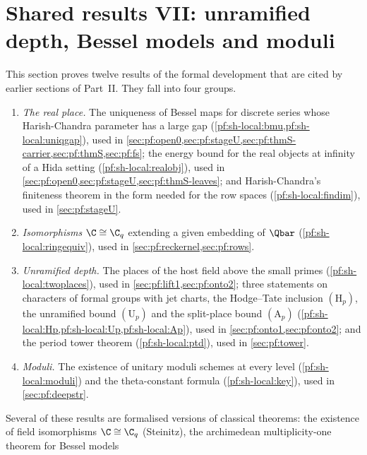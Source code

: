 \section{Shared results VII: unramified depth, Bessel models and moduli}\label{sec:pf:sh-local}

\providecommand{\shlocalpsi}{\psi_{\mathrm{std}}}
\providecommand{\shlocalHS}[1]{\|#1\|_{\mathrm{HS}}}
\providecommand{\shlocalE}{\mathcal{E}}
\providecommand{\shlocalOE}{\OO_{E}}
\providecommand{\shlocalZOE}{\Z_p\otimes\OO_E}

This section proves twelve results of the formal development \cite{LeanSource2026} that are cited by
earlier sections of Part~II. They fall into four groups.
\begin{enumerate}[label=(\arabic*)]
\item \emph{The real place.} The uniqueness of Bessel maps for discrete series whose Harish-Chandra parameter
has a large gap (\cref{pf:sh-local:bmu,pf:sh-local:uniqgap}), used in
\cref{sec:pf:open0,sec:pf:stageU,sec:pf:thmS-carrier,sec:pf:thmS,sec:pf:fs}; the energy bound for the real
objects at infinity of a Hida setting (\cref{pf:sh-local:realobj}), used in
\cref{sec:pf:open0,sec:pf:stageU,sec:pf:thmS-leaves}; and Harish-Chandra's finiteness theorem in the form
needed for the row spaces (\cref{pf:sh-local:findim}), used in \cref{sec:pf:stageU}.
\item \emph{Isomorphisms $\C\cong\C_q$} extending a given embedding of $\Qbar$ (\cref{pf:sh-local:ringequiv}),
used in \cref{sec:pf:reckernel,sec:pf:rows}.
\item \emph{Unramified depth.} The places of the host field above the small primes
(\cref{pf:sh-local:twoplaces}), used in \cref{sec:pf:lift1,sec:pf:onto2}; three statements on characters of
formal groups with jet charts, the Hodge--Tate inclusion $(\mathrm H_p)$, the unramified bound $(\mathrm U_p)$
and the split-place bound $(\mathrm A_p)$ (\cref{pf:sh-local:Hp,pf:sh-local:Up,pf:sh-local:Ap}), used in
\cref{sec:pf:onto1,sec:pf:onto2}; and the period tower theorem (\cref{pf:sh-local:ptd}), used in
\cref{sec:pf:tower}.
\item \emph{Moduli.} The existence of unitary moduli schemes at every level (\cref{pf:sh-local:moduli}) and the
theta-constant formula (\cref{pf:sh-local:key}), used in \cref{sec:pf:deepstr}.
\end{enumerate}
Several of these results are formalised versions of classical theorems: the existence of field isomorphisms
$\C\cong\C_q$ (Steinitz), the archimedean multiplicity-one theorem for Bessel models
